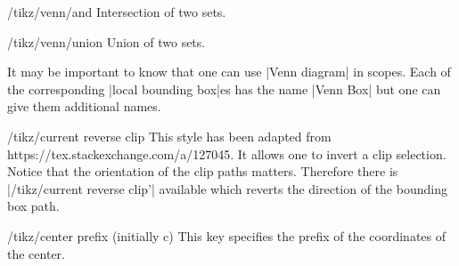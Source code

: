 \documentclass[a4paper]{ltxdoc}
\begin{document}
\begin{key}{/tikz/venn/and }
        Intersection of two sets. 
\end{key}

\begin{codeexample}[width=5cm]
\end{codeexample}

\begin{key}{/tikz/venn/union }
        Union of two sets. 
\end{key}

\begin{codeexample}[width=5cm]
\end{codeexample}

It may be important to know that one can use |Venn diagram| in scopes. Each of
the corresponding |local bounding box|es has the name |Venn Box| but one can
give them additional names.

\begin{codeexample}[]
\end{codeexample}

\begin{key}{/tikz/current reverse clip }
        This style has been adapted from https://tex.stackexchange.com/a/127045.
		It allows one to invert a clip selection. Notice that the orientation of
		the clip paths matters. Therefore there is |/tikz/current reverse clip'|
		available which reverts the direction of the bounding box path.
\end{key}

\begin{key}{/tikz/center prefix (initially c)}
        This key specifies the prefix of the coordinates of the center.
\end{key}
\end{document}

